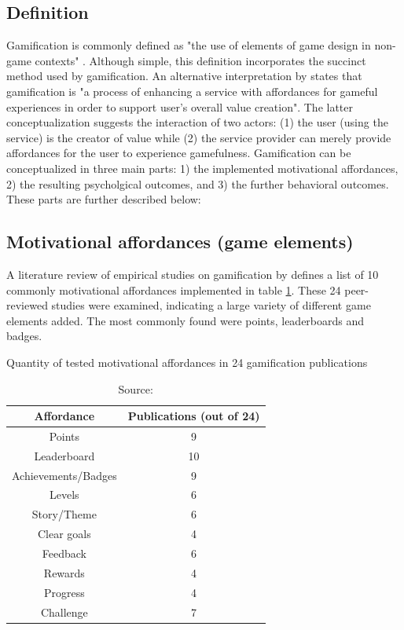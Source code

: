 \subsection{Definition}

Gamification is commonly defined as "the use of elements of game design in non-game contexts" \cite{deterding2011game}. Although simple, this definition incorporates the succinct method used by gamification. An alternative interpretation by \cite{huotari2012defining} states that gamification is "a process of enhancing a service with affordances for gameful experiences in order to support user's overall value creation". The latter conceptualization suggests the interaction of two actors: (1) the user (using the service) is the creator of value while (2) the service provider can merely provide affordances for the user to experience gamefulness. Gamification can be conceptualized in three main parts: 1) the implemented motivational affordances, 2) the resulting psycholgical outcomes, and 3) the further behavioral outcomes. These parts are further described below: 

\subsection{Motivational affordances (game elements)}

A literature review of empirical studies on gamification by \cite{hamari2014does} defines a list of 10 commonly motivational affordances implemented in table \ref{tab:motivational-affordances}. These 24 peer-reviewed studies were examined, indicating a large variety of different game elements added. The most commonly found were points, leaderboards and badges.

\begin{table}[h]
    \centering
    \caption{Quantity of tested motivational affordances in 24 gamification publications}
    \begin{tabular}{|c|c|}
        \hline Affordance & Publications (out of 24) \\
        \hline Points & 9 \\
        \hline Leaderboard & 10\\ 
        \hline Achievements/Badges & 9 \\
        \hline Levels & 6 \\
        \hline Story/Theme & 6 \\
        \hline Clear goals & 4 \\
        \hline Feedback & 6 \\
        \hline Rewards & 4 \\
        \hline Progress & 4 \\
        \hline Challenge & 7 \\
        \hline
    \end{tabular}
    \caption*{Source: \cite{hamari2014does}}
    \label{tab:motivational-affordances}
\end{table}

